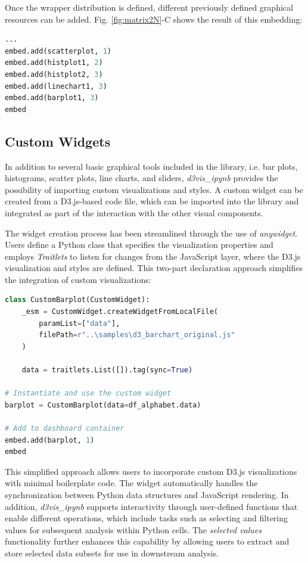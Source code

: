 Once the wrapper distribution is defined, different previously defined graphical resources can be added. Fig. \ref{fig:matrix2N}-C shows the result of this embedding:
\begin{lstlisting}[language=Python]
...
embed.add(scatterplot, 1)
embed.add(histplot1, 2) 
embed.add(histplot2, 3) 
embed.add(linechart1, 3)
embed.add(barplot1, 3)
embed
\end{lstlisting}

\subsection{Custom Widgets}
In addition to several basic graphical tools included in the library, i.e. bar plots, histograms, scatter plots, line charts, and sliders, \emph{d3vis\_ipynb} provides the possibility of importing custom visualizations and styles. A custom widget can be created from a D3.js-based code file, which can be imported into the library and integrated as part of the interaction with the other visual components. 

The widget creation process has been streamlined through the use of \emph{anywidget}. Users define a Python class that specifies the visualization properties and employs \emph{Traitlets} to listen for changes from the JavaScript layer, where the D3.js visualization and styles are defined. This two-part declaration approach simplifies the integration of custom visualizations:

\begin{lstlisting}[language=Python]
class CustomBarplot(CustomWidget):
    _esm = CustomWidget.createWidgetFromLocalFile(
        paramList=["data"], 
        filePath=r"..\samples\d3_barchart_original.js"
    )
    
    data = traitlets.List([]).tag(sync=True)

# Instantiate and use the custom widget
barplot = CustomBarplot(data=df_alphabet.data)

# Add to dashboard container
embed.add(barplot, 1)
embed
\end{lstlisting}

This simplified approach allows users to incorporate custom D3.js visualizations with minimal boilerplate code. The widget automatically handles the synchronization between Python data structures and JavaScript rendering. In addition, \emph{d3vis\_ipynb} supports interactivity through user-defined functions that enable different operations, which include tasks such as selecting and filtering values for subsequent analysis within Python cells. The \emph{selected values} functionality further enhances this capability by allowing users to extract and store selected data subsets for use in downstream analysis.